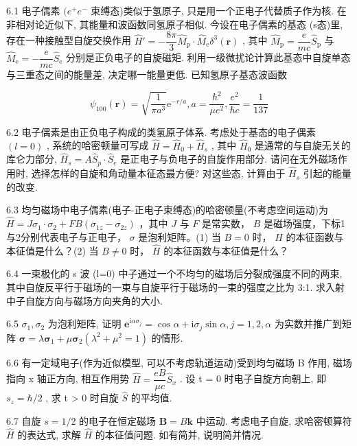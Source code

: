 6.1 电子偶素 $(e^{+}e^{-}$ 束缚态)类似于氢原子, 只是用一个正电子代替质子作为核. 在非相对论近似下, 其能量和波函数同氢原子相似. 今设在电子偶素的基态 (s态)里, 存在一种接触型自旋交换作用 $\hat{H}' = -\dfrac{8\pi}{3}\hat{M}_{\mathrm{p}} \cdot \hat{M}_{\mathrm{e}}\delta^{3}(\boldsymbol{r})$ , 其中 $\hat{M}_{\mathrm{p}} = \dfrac{e}{mc}\hat{S}_{\mathrm{p}}$ 与 $\hat{M}_{\mathrm{e}} = -\dfrac{e}{mc}\hat{S}_{\mathrm{e}}$ 分别是正负电子的自旋磁矩. 利用一级微扰论计算此基态中自旋单态与三重态之间的能量差, 决定哪一能量更低. 已知氢原子基态波函数

$$
\psi_ {1 0 0} (\boldsymbol {r}) = \sqrt {\frac {1}{\pi a ^ {3}}} \mathrm{e} ^ {- r / a}, a = \frac {\hbar^ {2}}{\mu e ^ {2}}, \frac {e ^ {2}}{\hbar c} = \frac {1}{1 3 7}
$$

\vfill\newpage

6.2 电子偶素是由正负电子构成的类氢原子体系. 考虑处于基态的电子偶素 $(l = 0)$ , 系统的哈密顿量可写成 $\hat{H} = \hat{H}_0 + \hat{H}_s$ , 其中 $\hat{H}_0$ 是通常的与自旋无关的库仑力部分, $\hat{H}_s = A\hat{S}_p \cdot \hat{S}_e$ 是正电子与负电子的自旋作用部分. 请问在无外磁场作用时, 选择怎样的自旋和角动量本征态最方便? 对这些态, 计算由于 $\hat{H}_s$ 引起的能量的改变.
\vfill\newpage

6.3 均匀磁场中电子偶素(电子-正电子束缚态)的哈密顿量(不考虑空间运动)为 $\hat{H} = J\sigma_{1} \cdot \sigma_{2} + FB(\sigma_{1z} - \sigma_{2z})$ ，其中 $J$ 与 $F$ 是常实数， $B$ 是磁场强度，下标1与2分别代表电子与正电子， $\sigma$ 是泡利矩阵。(1) 当 $B = 0$ 时， $\hat{H}$ 的本征函数与本征值是什么？(2) 当 $B \neq 0$ 时， $\hat{H}$ 的本征函数与本征值是什么？
\vfill\newpage

6.4 一束极化的 s 波 (l=0) 中子通过一个不均匀的磁场后分裂成强度不同的两束, 其中自旋反平行于磁场的一束与自旋平行于磁场的一束的强度之比为 3:1. 求入射中子自旋方向与磁场方向夹角的大小.
\vfill\newpage

6.5 $\sigma_{1},\sigma_{2}$ 为泡利矩阵, 证明 $\mathbf{e}^{\mathrm{i}\alpha \sigma_j} = \cos \alpha +\mathrm{i}\sigma_j\sin \alpha ,j = 1,2,\alpha$ 为实数并推广到矩阵 $\pmb {\sigma} = \lambda \pmb{\sigma}_{1} + \mu \pmb{\sigma}_{2}(\lambda^{2} + \mu^{2} = 1)$ 的情形.
\vfill\newpage

6.6 有一定域电子(作为近似模型, 可以不考虑轨道运动)受到均匀磁场 B 作用, 磁场指向 x 轴正方向, 相互作用势 $\hat{H} = \dfrac{eB}{\mu c} \hat{S}_{x}$ . 设 t = 0 时电子自旋方向朝上, 即 $s_{z} = \hbar / 2$ , 求 t > 0 时自旋 $\hat{S}$ 的平均值.
\vfill\newpage

6.7 自旋 $s = 1 / 2$ 的电子在恒定磁场 $\pmb{B} = B\pmb{k}$ 中运动. 考虑电子自旋, 求哈密顿算符 $\hat{H}$ 的表达式, 求解 $\hat{H}$ 的本征值问题. 如有简并, 说明简并情况.
\vfill\newpage

